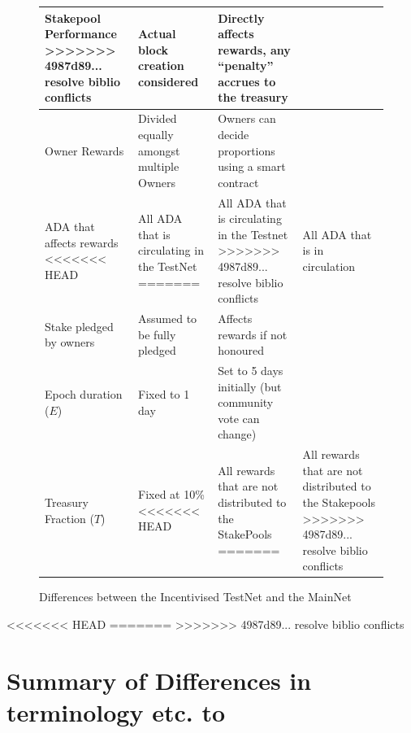 \documentclass[11pt,a4paper,dvipsnames,twosided,final]{article}
\begin{document}
\begin{figure}[h!]
\begin{center}
\begin{tabular}{||l|p{4cm}|p{4cm}||}
Stakepool Performance
>>>>>>> 4987d89... resolve biblio conflicts
& Actual block creation considered
& Directly affects rewards, any ``penalty'' accrues to the treasury
                                              \\\hline
Owner Rewards
& Divided equally amongst multiple Owners
& Owners can decide proportions using a smart contract
                                              \\\hline
ADA that affects rewards
<<<<<<< HEAD
& All ADA that is circulating in the TestNet
=======
& All ADA that is circulating in the Testnet
>>>>>>> 4987d89... resolve biblio conflicts
& All ADA that is in circulation
                                              \\\hline
Stake pledged by owners
& Assumed to be fully pledged
& %
Affects rewards if not honoured
                                              \\\hline
Epoch duration ($E$)
& Fixed to 1 day
& Set to 5 days initially (but community vote can change)
                                              \\\hline
Treasury Fraction ($T$)
& Fixed at 10\%
<<<<<<< HEAD
& All rewards that are not distributed to the StakePools
=======
& All rewards that are not distributed to the Stakepools
>>>>>>> 4987d89... resolve biblio conflicts
                                              \\\hline
\hline
\end{tabular}
\end{center}
\caption{Differences between the Incentivised TestNet and the MainNet}
\end{figure}

\clearpage



<<<<<<< HEAD
\clearpage
=======
>>>>>>> 4987d89... resolve biblio conflicts
\appendix

\section{Summary of Differences in terminology etc. to \cite{delegation_design}}
\label{app:diffs}
\end{document}
